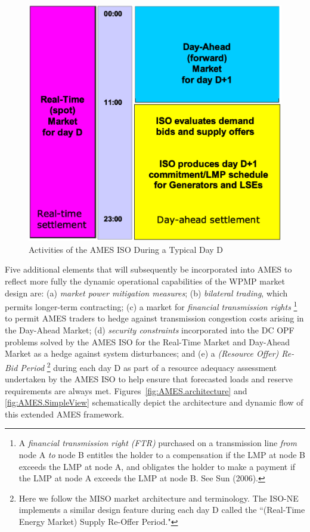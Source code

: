 \documentclass[12pt]{article}
\begin{document}
\begin{figure}
	\centering
		\includegraphics[totalheight = 9cm]{AMES.ISOEvent.eps}
	\caption{Activities of the AMES ISO During a Typical Day D}
	\label{fig:AMES.ISOEvent}
\end{figure}  


Five additional elements that will subsequently be incorporated into AMES to reflect more
fully the dynamic operational capabilities of the WPMP market design are: (a) \textit{market power mitigation 
measures\/}; (b) \textit{bilateral trading\/}, which permits longer-term contracting; (c) a market for
\textit{financial transmission rights\/}%
     \footnote{A \textit{financial transmission right (FTR)} purchased on a transmission line \textit{from\/} 
      node A \textit{to\/} node B entitles the holder to a compensation if the LMP at node B exceeds the LMP 
      at node A, and obligates the holder to make a payment 
      if the LMP at node A exceeds the LMP at node B. See Sun (2006).}
to permit AMES traders to hedge against transmission congestion costs arising in the Day-Ahead 
Market; (d) \textit{security constraints\/} incorporated into the DC OPF problems solved by the AMES ISO for 
the Real-Time Market and Day-Ahead Market as a hedge against system disturbances; and (e) a \textit{(Resource Offer) Re-Bid Period\/}%
     \footnote{Here we follow the MISO market architecture and terminology.  The ISO-NE implements a similar
         design feature during each day D called the ``(Real-Time Energy Market) Supply Re-Offer Period."} 
during each day D as part of a resource adequacy assessment undertaken by the AMES ISO 
to help ensure that forecasted loads and reserve requirements are always met.        
  Figures~\ref{fig:AMES.architecture} and \ref{fig:AMES.SimpleView} schematically depict the architecture and dynamic flow of this extended AMES framework.
 
\end{document}
